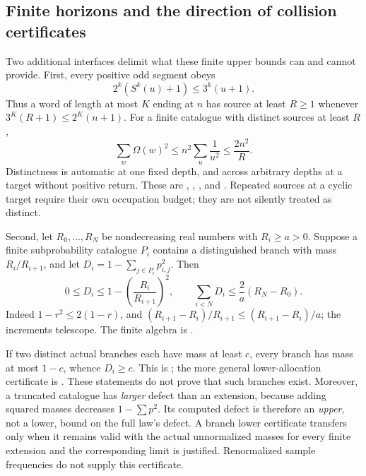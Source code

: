 \subsection{Finite horizons and the direction of collision certificates}

Two additional interfaces delimit what these finite upper bounds can
and cannot provide. First, every positive odd segment obeys
\begin{equation}\label{eq:v7-shifted-growth}
 2^k(S^k(u)+1)\le3^k(u+1).
\end{equation}
Thus a word of length at most $K$ ending at $n$ has source at least
$R\ge1$ whenever $3^K(R+1)\le2^K(n+1)$. For a finite catalogue with
distinct sources at least $R$,
\[
 \sum_w\Omega(w)^2\le n^2\sum_u\frac1{u^2}
 \le\frac{2n^2}{R}.
\]
Distinctness is automatic at one fixed depth, and across arbitrary
depths at a target without positive return. These are
,
, ,
and . Repeated sources at a cyclic
target require their own occupation budget; they are not silently
treated as distinct.

Second, let $R_0,\ldots,R_N$ be nondecreasing real numbers with
$R_i\ge a>0$. Suppose a finite subprobability catalogue $P_i$ contains
a distinguished branch with mass $R_i/R_{i+1}$, and let
$D_i=1-\sum_{j\in P_i}p_{i,j}^2$. Then
\begin{equation}\label{eq:v7-collision-budget}
 0\le D_i\le1-\left(\frac{R_i}{R_{i+1}}\right)^2,
 \qquad
 \sum_{i<N}D_i\le\frac2a(R_N-R_0).
\end{equation}
Indeed $1-r^2\le2(1-r)$, and
$(R_{i+1}-R_i)/R_{i+1}\le(R_{i+1}-R_i)/a$; the increments telescope.
The finite algebra is
.

If two distinct actual branches each have mass at least $c$, every
branch has mass at most $1-c$, whence $D_i\ge c$. This is
;
the more general lower-allocation certificate is
. These statements
do not prove that such branches exist. Moreover, a truncated catalogue
has \emph{larger} defect than an extension, because adding squared
masses decreases $1-\sum p^2$. Its computed defect is therefore an
\emph{upper}, not a lower, bound on the full law's defect. A branch
lower certificate transfers only when it remains valid with the actual
unnormalized masses for every finite extension and the corresponding
limit is justified. Renormalized sample frequencies do not supply this
certificate.

